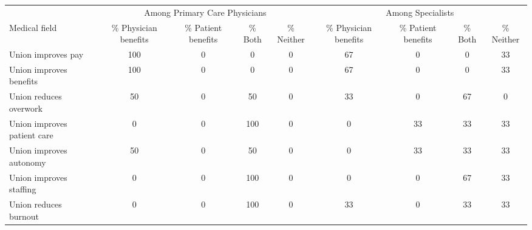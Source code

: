 \begin{tabular}{lcccccccc}\toprule
 & \multicolumn{4}{c}{Among Primary Care Physicians} & \multicolumn{4}{c}{Among Specialists} \\
\cmidrule(lr){2-5} \cmidrule(lr){6-9}
Medical field & \% Physician benefits  & \% Patient benefits & \% Both & \% Neither & \% Physician benefits  & \% Patient benefits & \% Both & \% Neither \\ \midrule
Union improves pay & 100 & 0 & 0 & 0 & 67 & 0 & 0 & 33 \\
Union improves benefits & 100 & 0 & 0 & 0 & 67 & 0 & 0 & 33 \\
Union reduces overwork & 50 & 0 & 50 & 0 & 33 & 0 & 67 & 0 \\
\midrule
Union improves patient care & 0 & 0 & 100 & 0 & 0 & 33 & 33 & 33 \\
Union improves autonomy & 50 & 0 & 50 & 0 & 0 & 33 & 33 & 33 \\
Union improves staffing & 0 & 0 & 100 & 0 & 0 & 0 & 67 & 33 \\
\midrule
Union reduces burnout & 0 & 0 & 100 & 0 & 33 & 0 & 33 & 33 \\
\bottomrule\end{tabular}
